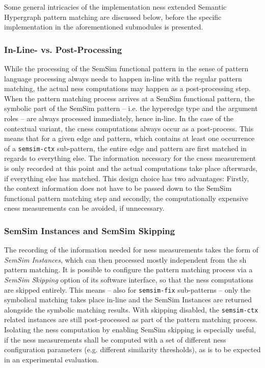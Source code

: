 \documentclass[11pt]{scrreprt}
\begin{document}
Some general intricacies of the implementation \gls{ness} extended Semantic Hypergraph pattern matching are discussed below, before the specific implementation in the aforementioned submodules is presented.


\subsubsection{In-Line- vs. Post-Processing}
While the processing of the SemSim functional pattern in the sense of pattern language processing always needs to happen in-line with the regular pattern matching, the actual \gls{ness} computations may happen as a post-processing step. When the pattern matching process arrives at a SemSim functional pattern, the symbolic part of the SemSim pattern -- i.e. the hyperedge type and the argument roles -- are always processed immediately, hence in-line. In the case of the contextual variant, the \gls{cness} computations always occur as a post-process. This means that for a given edge and pattern, which contains at least one occurrence of a \texttt{semsim-ctx} sub-pattern, the entire edge and pattern are first matched in regards to everything else. The information necessary for the \gls{cness} measurement is only recorded at this point and the actual computations take place afterwards, if everything else has matched. This design choice has two advantages: Firstly, the context information does not have to be passed down to the SemSim functional pattern matching step and secondly, the computationally expensive \gls{cness} measurements can be avoided, if unnecessary.

\subsubsection{SemSim Instances and SemSim Skipping}
The recording of the information needed for \gls{ness} measurements takes the form of \textit{SemSim Instances}, which can then processed mostly independent from the \gls{sh} pattern matching.  
It is possible to configure the pattern matching process via a \textit{SemSim Skipping} option of its software interface, so that the \gls{ness} computations are skipped entirely. This means -- also for \texttt{semsim-fix} sub-patterns -- only the symbolical matching takes place in-line and the SemSim Instances are returned alongside the symbolic matching results. With skipping disabled, the \texttt{semsim-ctx} related instances are still post-processed as part of the pattern matching process. Isolating the \gls{ness} computation by enabling SemSim skipping is especially useful, if the \gls{ness} measurements shall be computed with a set of different \gls{ness} configuration parameters (e.g. different similarity thresholds), as is to be expected in an experimental evaluation.
\end{document}
